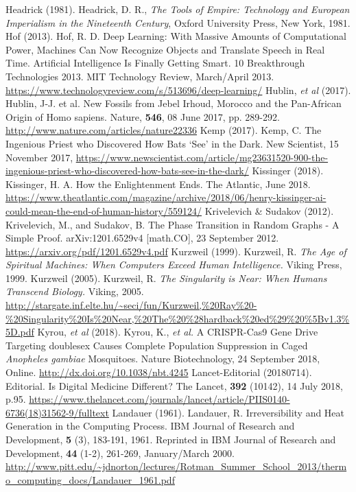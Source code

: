 \begin{multicols}{2}
\begin{thebibliography}{99}
 Headrick (1981). Headrick, D. R., \textit{The Tools of Empire: Technology and European Imperialism in the Nineteenth Century}, Oxford University Press, New York, 1981.
 Hof (2013). Hof, R. D. Deep Learning: With Massive Amounts of Computational Power, Machines Can Now Recognize Objects and Translate Speech in Real Time. Artificial Intelligence Is Finally Getting Smart. 10 Breakthrough Technologies 2013. MIT Technology Review, March/April 2013. \url{https://www.technologyreview.com/s/513696/deep-learning/}
 Hublin, \textit{et al} (2017). Hublin, J-J. et al. New Fossils from Jebel Irhoud, Morocco and the Pan-African Origin of Homo sapiens. Nature, \textbf{546}, 08 June 2017, pp. 289-292. \url{http://www.nature.com/articles/nature22336}
 Kemp (2017). Kemp, C. The Ingenious Priest who Discovered How Bats ‘See’ in the Dark. New Scientist, 15 November 2017, \url{https://www.newscientist.com/article/mg23631520-900-the-ingenious-priest-who-discovered-how-bats-see-in-the-dark/}
 Kissinger (2018). Kissinger, H. A. How the Enlightenment Ends. The Atlantic, June 2018. \url{https://www.theatlantic.com/magazine/archive/2018/06/henry-kissinger-ai-could-mean-the-end-of-human-history/559124/}
 Krivelevich \& Sudakov (2012). Krivelevich, M., and Sudakov, B. The Phase Transition in Random Graphs - A Simple Proof. arXiv:1201.6529v4 [math.CO], 23 September 2012. \url{https://arxiv.org/pdf/1201.6529v4.pdf}
 Kurzweil (1999). Kurzweil, R. \textit{The Age of Spiritual Machines: When Computers Exceed Human Intelligence.} Viking Press, 1999.
 Kurzweil (2005). Kurzweil, R. \textit{The Singularity is Near: When Humans Transcend Biology.} Viking, 2005. \url{http://stargate.inf.elte.hu/~seci/fun/Kurzweil,%20Ray%20-%20Singularity%20Is%20Near,%20The%20%28hardback%20ed%29%20%5Bv1.3%5D.pdf}
 Kyrou, \textit{et al} (2018). Kyrou, K., \textit{et al.} A CRISPR-Cas9 Gene Drive Targeting doublesex Causes Complete Population Suppression in Caged \textit{Anopheles gambiae} Mosquitoes. Nature Biotechnology, 24 September 2018, Online. \url{http://dx.doi.org/10.1038/nbt.4245}
 Lancet-Editorial (20180714). Editorial. Is Digital Medicine Different? The Lancet, \textbf{392} (10142), 14 July 2018, p.95. \url{https://www.thelancet.com/journals/lancet/article/PIIS0140-6736(18)31562-9/fulltext}
 Landauer (1961). Landauer, R. Irreversibility and Heat Generation in the Computing Process. IBM Journal of Research and Development, \textbf{5} (3), 183-191, 1961. Reprinted in IBM Journal of Research and Development, \textbf{44} (1-2), 261-269, January/March 2000. \url{http://www.pitt.edu/~jdnorton/lectures/Rotman_Summer_School_2013/thermo_computing_docs/Landauer_1961.pdf}

\end{thebibliography}
\end{multicols}
